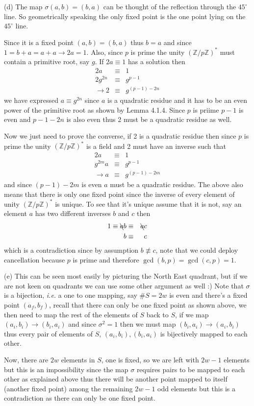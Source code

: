 \documentclass[aps,preprint,preprintnumbers,nofootinbib,showpacs,prd]{revtex4-1}
\newcommand{\ie}{{\it i.e.} }
\newcommand{\nbea}{\begin{eqnarray*}}
\newcommand{\neea}{\end{eqnarray*}}
\begin{document}
(d) The map $\sigma(a,b) = (b,a)$ can be thought of the reflection through the $45^\circ$ line. So geometrically speaking the only fixed point is the one point lying on the $45^\circ$ line.

Since it is a fixed point $(a,b) = (b,a)$ thus $b = a$ and since $1 = b + a = a + a \to 2a = 1$. Also, since $p$ is prime the unity $(\mathbb{Z}/p\mathbb{Z})^*$ must contain a primitive root, say $g$. If $2a \equiv 1$ has a solution then
%
\nbea
2a & \equiv & 1 \\
2 g^{2n}& \equiv & g^{p-1} \\
\to 2 & \equiv & g^{(p-1) - 2n}
\neea
%
we have expressed $a \equiv g^{2n}$ since $a$ is a quadratic residue and it has to be an even power of the primitive root as shown by Lemma 4.1.4. Since $p$ is priime $p-1$ is even and $p-1-2n$ is also even thus 2 must be a quadratic residue as well.

Now we just need to prove the converse, if 2 is a quadratic residue then since $p$ is prime the unity $(\mathbb{Z}/p\mathbb{Z})^*$ is a field and 2 must have an inverse such that
%
\nbea
2a & \equiv & 1 \\
g^{2m} a & \equiv & g^{p-1} \\
\to a & \equiv & g^{(p-1) - 2m}
\neea
%
and since $(p-1) - 2m$ is even $a$ must be a quadratic residue. The above also means that there is only one fixed point since the inverse of every element of unity $(\mathbb{Z}/p\mathbb{Z})^*$ is unique. To see that it's unique assume that it is not, say an element $a$ has two different inverses $b$ and $c$ then
%
\nbea
1 \equiv \bcancel{a}b & \equiv & \bcancel{a}c \\
b & \equiv & c
\neea
%
which is a contradiction since by assumption $b \not\equiv c$, note that we could deploy cancellation because $p$ is prime and therefore $\gcd(b,p) = \gcd(c,p) = 1$.

(e) This can be seen most easily by picturing the North East quadrant, but if we are not keen on quadrants we can use some other argument as well :) Note that $\sigma$ is a bijection, \ie a one to one mapping, say $\#S = 2w$ is even and there's a fixed point $(a_f,b_f)$, recall that there can only be one fixed point as shown above, we then need to map the rest of the elements of $S$ back to $S$, if we map $(a_i,b_i) \rightarrow (b_i,a_i)$ and since $\sigma^2 = 1$ then we must map $(b_i,a_i) \rightarrow (a_i,b_i)$ thus every pair of elements of $S$, $(a_i,b_i),(b_i,a_i)$ is bijectively mapped to each other.

Now, there are $2w$ elements in $S$, one is fixed, so we are left with $2w-1$ elements but this is an impossibility since the map $\sigma$ requires pairs to be mapped to each other as explained above thus there will be another point mapped to itself (another fixed point) among the remaining $2w-1$ odd elements but this is a contradiction as there can only be one fixed point.
\end{document}

